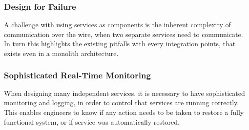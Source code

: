 \subsubsection*{Design for Failure}
A challenge with using services as components is the inherent complexity of communication over the wire, when two separate services need to communicate. In turn this highlights the existing pitfalls with every integration points, that exists even in a monolith architecture.

\subsubsection*{Sophisticated Real-Time Monitoring}
When designing many independent services, it is necessary to have sophisticated monitoring and logging, in order to control that services are running correctly. This enables engineers to know if any action needs to be taken to restore a fully functional system, or if service was automatically restored.

